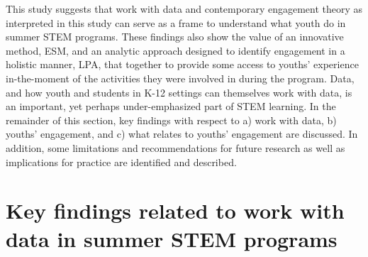 \documentclass[]{msu-thesis}
\theoremstyle{definition}
\theoremstyle{definition}
\theoremstyle{definition}
\theoremstyle{remark}
\begin{document}
This study suggests that work with data and contemporary engagement
theory as interpreted in this study can serve as a frame to understand
what youth do in summer STEM programs. These findings also show the
value of an innovative method, ESM, and an analytic approach designed to
identify engagement in a holistic manner, LPA, that together to provide
some access to youths' experience in-the-moment of the activities they
were involved in during the program. Data, and how youth and students in
K-12 settings can themselves work with data, is an important, yet
perhaps under-emphasized part of STEM learning. In the remainder of this
section, key findings with respect to a) work with data, b) youths'
engagement, and c) what relates to youths' engagement are discussed. In
addition, some limitations and recommendations for future research as
well as implications for practice are identified and described.

\section{Key findings related to work with data in summer STEM
programs}\label{key-findings-related-to-work-with-data-in-summer-stem-programs}
\end{document}
